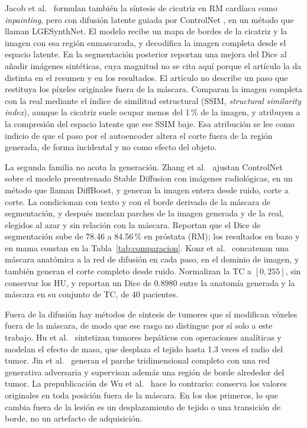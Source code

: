 Jacob et al.~\cite{jacob2026lgesynthnet} formulan también la síntesis de cicatriz en RM cardíaca como \emph{inpainting}, pero con difusión latente guiada por ControlNet \cite{zhang2023controlnet}, en un método que llaman LGESynthNet. El modelo recibe un mapa de bordes de la cicatriz y la imagen con esa región enmascarada, y decodifica la imagen completa desde el espacio latente. En la segmentación posterior reportan una mejora del Dice al añadir imágenes sintéticas, cuya magnitud no se cita aquí porque el artículo la da distinta en el resumen y en los resultados. El artículo no describe un paso que restituya los píxeles originales fuera de la máscara. Comparan la imagen completa con la real mediante el índice de similitud estructural (SSIM, \emph{structural similarity index}), aunque la cicatriz suele ocupar menos del 1\,\% de la imagen, y atribuyen a la compresión del espacio latente que ese SSIM baje. Esa atribución se lee como indicio de que el paso por el autoencoder altera el corte fuera de la región generada, de forma incidental y no como efecto del objeto.

La segunda familia no acota la generación. Zhang et al.~\cite{zhang2025diffboost} ajustan ControlNet sobre el modelo preentrenado Stable Diffusion con imágenes radiológicas, en un método que llaman DiffBoost, y generan la imagen entera desde ruido, corte a corte. La condicionan con texto y con el borde derivado de la máscara de segmentación, y después mezclan parches de la imagen generada y de la real, elegidos al azar y sin relación con la máscara. Reportan que el Dice de segmentación sube de 78.46 a 84.56\,\% en próstata (RM); los resultados en bazo y en mama constan en la Tabla~\ref{tab:comparacion}. Konz et al.~\cite{konz2024anatomicallycontrollable} concatenan una máscara anatómica a la red de difusión en cada paso, en el dominio de imagen, y también generan el corte completo desde ruido. Normalizan la TC a $[0, 255]$, sin conservar los HU, y reportan un Dice de 0.8980 entre la anatomía generada y la máscara en su conjunto de TC, de 40 pacientes.

Fuera de la difusión hay métodos de síntesis de tumores que sí modifican vóxeles fuera de la máscara, de modo que ese rasgo no distingue por sí solo a este trabajo. Hu et al.~\cite{hu2023} sintetizan tumores hepáticos con operaciones analíticas y modelan el efecto de masa, que desplaza el tejido hasta 1.3 veces el radio del tumor. Jin et al.~\cite{jin2021freetumor} generan el parche tridimensional completo con una red generativa adversaria y supervisan además una región de borde alrededor del tumor. La prepublicación de Wu et al.~\cite{wu2025freetumor} hace lo contrario: conserva los valores originales en toda posición fuera de la máscara. En los dos primeros, lo que cambia fuera de la lesión es un desplazamiento de tejido o una transición de borde, no un artefacto de adquisición.

